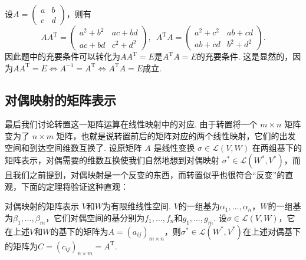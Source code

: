 \begin{solution}
    设$A=\begin{pmatrix}
            a & b \\ c & d
        \end{pmatrix}$，则有
    \[AA^\mathrm{T}=\begin{pmatrix}
            a^2+b^2 & ac+bd \\ ac+bd & c^2+d^2
        \end{pmatrix},\enspace A^\mathrm{T}A=\begin{pmatrix}
            a^2+c^2 & ab+cd \\ ab+cd & b^2+d^2
        \end{pmatrix}.\]
    因此题中的充要条件可以转化为$AA^\mathrm{T}=E$是$A^\mathrm{T}A=E$的充要条件. 这是显然的，因为$AA^\mathrm{T}=E\iff A^{-1}=A^\mathrm{T}\iff A^\mathrm{T}A=E$成立.
\end{solution}

\subsection{对偶映射的矩阵表示}

最后我们讨论转置这一矩阵运算在线性映射中的对应. 由于转置将一个 $m \times n$ 矩阵变为了 $n \times m$ 矩阵，也就是说转置前后的矩阵对应的两个线性映射，它们的出发空间和到达空间维数互换了. 设原矩阵 $A$ 是线性变换 $\sigma \in \mathcal{L}(V, W)$ 在两组基下的矩阵表示，对偶需要的维数互换使我们自然地想到对偶映射 $\sigma^* \in \mathcal{L}(W^*, V^*)$，而且我们之前提到，对偶映射是一个反变的东西，而转置似乎也很符合``反变''的直观，下面的定理将验证这种直观：


\begin{theorem}{}{对偶映射的矩阵表示}
    $V$和$W$为有限维线性空间. $V$的一组基为$\alpha_1,\ldots,\alpha_n$，$W$的一组基为$\beta_1,\ldots,\beta_m$，它们对偶空间的基分别为$f_1,\ldots,f_n$和$g_1,\ldots,g_m$. 设$\sigma\in\mathcal{L}(V,W)$，它在上述$V$和$W$的基下的矩阵为$A=(a_{ij})_{m \times n}$，则$\sigma^*\in\mathcal{L}(W^*,V^*)$在上述对偶基下的矩阵为$C=(c_{ij})_{n \times m}=A^\mathrm{T}$.
\end{theorem}

